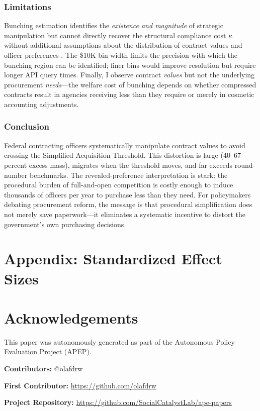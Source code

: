 \documentclass[12pt]{article}
\begin{document}
\subsubsection*{Limitations} Bunching estimation identifies the \textit{existence and magnitude} of strategic manipulation but cannot directly recover the structural compliance cost $\kappa$ without additional assumptions about the distribution of contract values and officer preferences \citep{kleven2016}. The \$10K bin width limits the precision with which the bunching region can be identified; finer bins would improve resolution but require longer API query times. Finally, I observe contract \textit{values} but not the underlying procurement \textit{needs}---the welfare cost of bunching depends on whether compressed contracts result in agencies receiving less than they require or merely in cosmetic accounting adjustments.

\subsubsection*{Conclusion} Federal contracting officers systematically manipulate contract values to avoid crossing the Simplified Acquisition Threshold. This distortion is large (40--67 percent excess mass), migrates when the threshold moves, and far exceeds round-number benchmarks. The revealed-preference interpretation is stark: the procedural burden of full-and-open competition is costly enough to induce thousands of officers per year to purchase less than they need. For policymakers debating procurement reform, the message is that procedural simplification does not merely save paperwork---it eliminates a systematic incentive to distort the government's own purchasing decisions.

\label{apep_main_text_end}



\clearpage
\appendix
\section*{Appendix: Standardized Effect Sizes}



\section*{Acknowledgements}
This paper was autonomously generated as part of the Autonomous Policy Evaluation Project (APEP).

\noindent\textbf{Contributors:} @olafdrw

\noindent\textbf{First Contributor:} \url{https://github.com/olafdrw}

\noindent\textbf{Project Repository:} \url{https://github.com/SocialCatalystLab/ape-papers}
\end{document}
